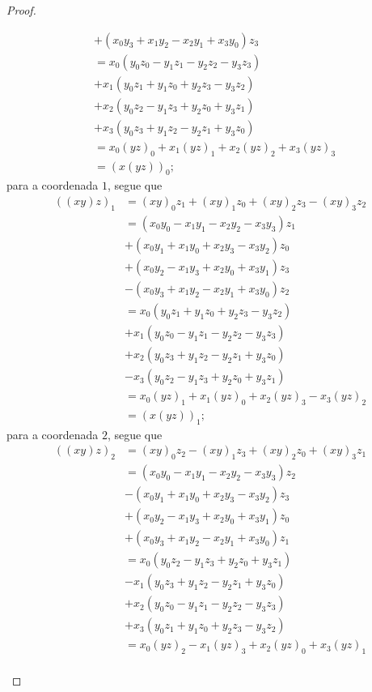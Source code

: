 \begin{proof}
\begin{itemize}
\begin{align*}
			&+ (x_0y_3 + x_1y_2 - x_2y_1 + x_3y_0)z_3 \\
			&= x_0(y_0z_0 - y_1z_1 - y_2z_2 - y_3z_3) \\
			&+ x_1(y_0z_1 + y_1z_0 + y_2z_3 - y_3z_2) \\
			&+ x_2(y_0z_2 - y_1z_3 + y_2z_0 + y_3z_1) \\
			&+ x_3(y_0z_3 + y_1z_2 - y_2z_1 + y_3z_0) \\
			&= x_0(yz)_0 + x_1(yz)_1 + x_2(yz)_2 + x_3(yz)_3 \\
			&= (x(yz))_0;
		\end{align*}
	para a coordenada $1$, segue que
		\begin{align*}
		((xy)z)_1 &= (xy)_0z_1 + (xy)_1z_0 + (xy)_2z_3 - (xy)_3z_2 \\
			&= (x_0y_0 - x_1y_1 - x_2y_2 - x_3y_3)z_1 \\
			&+ (x_0y_1 + x_1y_0 + x_2y_3 - x_3y_2)z_0 \\
			&+ (x_0y_2 - x_1y_3 + x_2y_0 + x_3y_1)z_3 \\
			&- (x_0y_3 + x_1y_2 - x_2y_1 + x_3y_0)z_2 \\
			&= x_0(y_0z_1 + y_1z_0 + y_2z_3 - y_3z_2) \\
			&+ x_1(y_0z_0 - y_1z_1 - y_2z_2 - y_3z_3) \\
			&+ x_2(y_0z_3 + y_1z_2 - y_2z_1 + y_3z_0) \\
			&- x_3(y_0z_2 - y_1z_3 + y_2z_0 + y_3z_1) \\
			&= x_0(yz)_1 + x_1(yz)_0 + x_2(yz)_3 - x_3(yz)_2 \\
			&= (x(yz))_1;
		\end{align*}
	para a coordenada $2$, segue que
		\begin{align*}
		((xy)z)_2 &= (xy)_0z_2 - (xy)_1z_3 + (xy)_2z_0 + (xy)_3z_1 \\
			&= (x_0y_0 - x_1y_1 - x_2y_2 - x_3y_3)z_2 \\
			&- (x_0y_1 + x_1y_0 + x_2y_3 - x_3y_2)z_3 \\
			&+ (x_0y_2 - x_1y_3 + x_2y_0 + x_3y_1)z_0 \\
			&+ (x_0y_3 + x_1y_2 - x_2y_1 + x_3y_0)z_1 \\
			&= x_0(y_0z_2 - y_1z_3 + y_2z_0 + y_3z_1) \\
			&- x_1(y_0z_3 + y_1z_2 - y_2z_1 + y_3z_0) \\
			&+ x_2(y_0z_0 - y_1z_1 - y_2z_2 - y_3z_3) \\
			&+ x_3(y_0z_1 + y_1z_0 + y_2z_3 - y_3z_2) \\
			&= x_0(yz)_2 - x_1(yz)_3 + x_2(yz)_0 + x_3(yz)_1 \\

\end{align*}
\end{itemize}
\end{proof}
